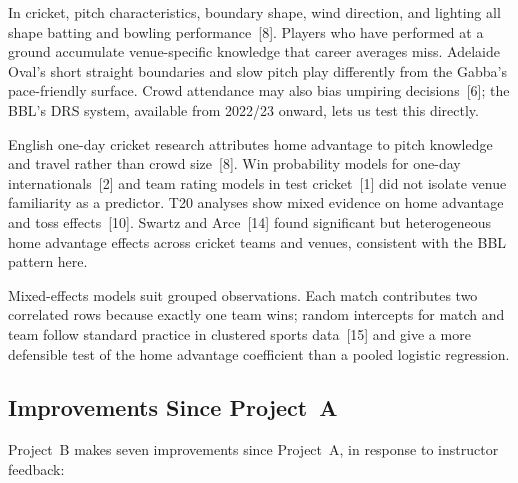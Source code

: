 \documentclass[12pt,a4paper]{article}
\begin{document}
In cricket, pitch characteristics, boundary shape, wind direction, and lighting all shape
batting and bowling performance~[8]. Players who have performed at a ground accumulate
venue-specific knowledge that career averages miss. Adelaide Oval's short straight boundaries
and slow pitch play differently from the Gabba's pace-friendly surface. Crowd attendance may
also bias umpiring decisions~[6]; the BBL's DRS system, available from 2022/23 onward, lets
us test this directly.

English one-day cricket research attributes home advantage to pitch knowledge and travel
rather than crowd size~[8]. Win probability models for one-day internationals~[2] and team
rating models in test cricket~[1] did not isolate venue familiarity as a predictor. T20
analyses show mixed evidence on home advantage and toss effects~[10]. Swartz and Arce~[14] found significant but heterogeneous home advantage effects across
cricket teams and venues, consistent with the BBL pattern here.

Mixed-effects models suit grouped observations. Each match contributes two correlated rows
because exactly one team wins; random intercepts for match and team follow standard practice
in clustered sports data~[15] and give a more defensible test of the home advantage
coefficient than a pooled logistic regression.

\subsection{Improvements Since Project~A}

Project~B makes seven improvements since Project~A, in response to instructor feedback:
\end{document}
